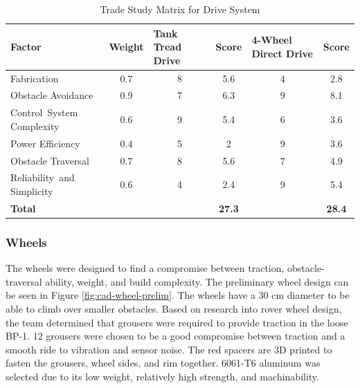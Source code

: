 \documentclass[class=article, crop=false]{standalone}
\begin{document}
\FloatBarrier
	\begin{table}[h]
	\footnotesize
	\centering
	\begin{tabular}{ | p{8em} | m{4em} | m{6em} | m{3em} | m{8em} | m{3em} | }
 	\hline
 		\rowcolor[gray]{0.8}
 		\textbf{Factor} &\textbf{Weight} &\textbf{Tank Tread Drive} &\textbf{Score} &\textbf{4-Wheel Direct Drive} &\textbf{Score}  \\ 
 		\hline
		Fabrication                       &  \multicolumn{1}{c|}{0.7}  &  \multicolumn{1}{c|}{8}    &  \multicolumn{1}{c|}{5.6}  &  \multicolumn{1}{c|}{4}    &  \multicolumn{1}{c|}{2.8}   \\ 
 		\hline
 		Obstacle \mbox{Avoidance}         &  \multicolumn{1}{c|}{0.9}  &  \multicolumn{1}{c|}{7}    &  \multicolumn{1}{c|}{6.3}  &  \multicolumn{1}{c|}{9}    &  \multicolumn{1}{c|}{8.1}   \\ 
 		\hline
 		\mbox{Control System} Complexity  &  \multicolumn{1}{c|}{0.6}  &  \multicolumn{1}{c|}{9}    &  \multicolumn{1}{c|}{5.4}  &  \multicolumn{1}{c|}{6}    &  \multicolumn{1}{c|}{3.6}   \\
 		\hline
 		Power \mbox{Efficiency}           &  \multicolumn{1}{c|}{0.4}  &  \multicolumn{1}{c|}{5}    &  \multicolumn{1}{c|}{2}    &  \multicolumn{1}{c|}{9}    &  \multicolumn{1}{c|}{3.6}   \\ 
 		\hline
 		Obstacle \mbox{Traversal}         &  \multicolumn{1}{c|}{0.7}  &  \multicolumn{1}{c|}{8}    &  \multicolumn{1}{c|}{5.6}  &  \multicolumn{1}{c|}{7}    &  \multicolumn{1}{c|}{4.9}   \\
 		\hline
 		\mbox{Reliability and} Simplicity &  \multicolumn{1}{c|}{0.6}  &  \multicolumn{1}{c|}{4}    &  \multicolumn{1}{c|}{2.4}  &  \multicolumn{1}{c|}{9}    &  \multicolumn{1}{c|}{5.4}   \\
 		\hline
 		\rowcolor[gray]{0.9}
 		\textbf{Total}                    &       &       &\multicolumn{1}{c|}{\textbf{27.3}}&       &\multicolumn{1}{c|}{\textbf{28.4}}\\
 		\hline
	\end{tabular}
	\caption{Trade Study Matrix for Drive System }
		\label{table:drive_trade_study}
	\end{table}
	\FloatBarrier
	
	\subsubsection{Wheels}
	The wheels were designed to find a compromise between traction, obstacle-traversal ability, weight, and build complexity. The preliminary wheel design can be seen in Figure \ref{fig:cad-wheel-prelim}. The wheels have a 30 cm diameter to be able to climb over smaller obstacles. Based on research into rover wheel design, the team determined that grousers were required to provide traction in the loose BP-1. 12 grousers were chosen to be a good compromise between traction and a smooth ride to vibration and sensor noise. The red spacers are 3D printed to fasten the grousers, wheel sides, and rim together. 6061-T6 aluminum was selected due to its low weight, relatively high strength, and machinability.
	
\end{document}
